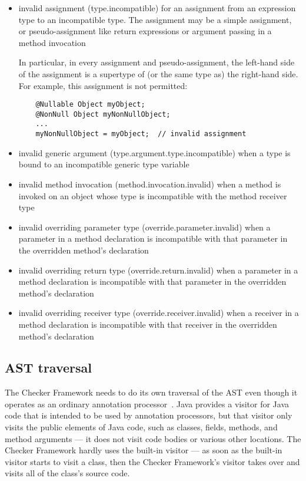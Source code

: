 \begin{itemize}

\item invalid assignment (type.incompatible) for an assignment from
  an expression type to an incompatible type.  The assignment may be a
  simple assignment, or pseudo-assignment like return expressions or
  argument passing in a method invocation

  In particular, in every assignment and pseudo-assignment, the
  left-hand side of the assignment is a supertype of (or the same type
  as) the right-hand side.  For example, this assignment is not
  permitted:

  \begin{Verbatim}
    @Nullable Object myObject;
    @NonNull Object myNonNullObject;
    ...
    myNonNullObject = myObject;  // invalid assignment
  \end{Verbatim}

\item invalid generic argument (type.argument.type.incompatible) when a type
  is bound to an incompatible generic type variable

\item invalid method invocation (method.invocation.invalid) when a
  method is invoked on an object whose type is incompatible with the
  method receiver type

\item invalid overriding parameter type (override.parameter.invalid)
  when a parameter in a method declaration is incompatible with that
  parameter in the overridden method's declaration

\item invalid overriding return type (override.return.invalid) when a
  parameter in a method declaration is incompatible with that
  parameter in the overridden method's declaration

\item invalid overriding receiver type (override.receiver.invalid)
  when a receiver in a method declaration is incompatible with that
  receiver in the overridden method's declaration

\end{itemize}


\subsection{AST traversal\label{creating-ast-traversal}}

The Checker Framework needs to do its own traversal of the AST even though
it operates as an ordinary annotation processor~\cite{JSR269}.  Java
provides a visitor for Java code that is intended to be used by annotation
processors, but that visitor only
visits the public elements of Java code, such as classes, fields, methods,
and method arguments --- it does not visit code bodies or various other
locations.  The Checker Framework hardly uses the built-in visitor --- as
soon as the built-in visitor starts to visit a class, then the Checker
Framework's visitor takes over and visits all of the class's source code.

